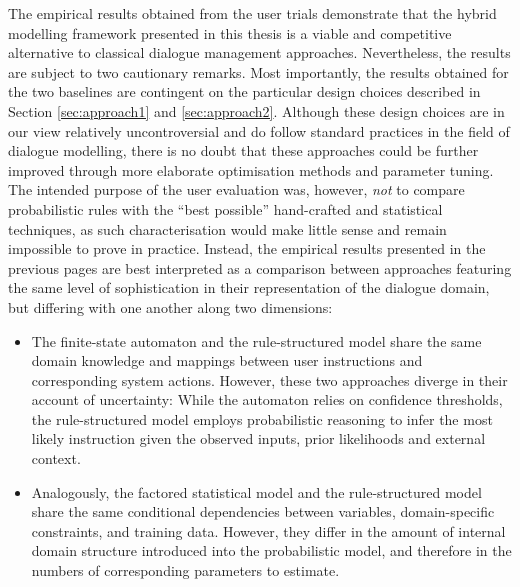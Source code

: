 The empirical results obtained from the user trials demonstrate that the hybrid modelling framework presented in this thesis is a viable and competitive alternative to classical dialogue management approaches.  Nevertheless, the results are subject to two cautionary remarks.  Most importantly, the results obtained for the two baselines are contingent on the particular design choices described in Section \ref{sec:approach1} and \ref{sec:approach2}.  Although these design choices are in our view relatively uncontroversial and do follow standard practices in the field of dialogue modelling, there is no doubt that these approaches could be further improved through more elaborate optimisation methods and parameter tuning. The intended purpose of the user evaluation was, however, \textit{not} to compare probabilistic rules with the ``best possible'' hand-crafted and statistical techniques, as such characterisation would make little sense and remain impossible to prove in practice. Instead, the empirical results presented in the previous pages are best interpreted as a comparison between approaches featuring the same level of sophistication in their representation of the dialogue domain, but differing with one another along two dimensions:
\begin{itemize}
\item The finite-state automaton and the rule-structured model share the same domain knowledge and mappings between user instructions and corresponding system actions.  However, these two approaches diverge in their account of uncertainty: While the automaton relies on confidence thresholds, the rule-structured model employs probabilistic reasoning to infer the most likely instruction given the observed inputs, prior likelihoods and external context.
\item Analogously, the factored statistical model and the rule-structured model share the same conditional dependencies between variables, domain-specific constraints, and training data. However, they differ in the amount of internal domain structure introduced into the probabilistic model, and therefore in the numbers of corresponding parameters to estimate.
\end{itemize}

